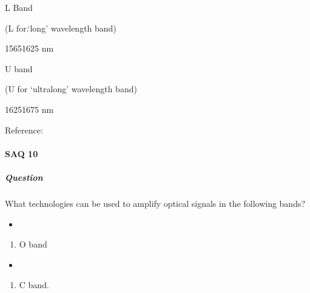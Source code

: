 \documentclass[letterpaper,10pt,english]{sphinxmanual}
\begin{document}
L Band





(L for.‘long’ wavelength band)





1565\textendash{}1625 nm









U band





(U for ‘ultra\sphinxhyphen{}long’ wavelength band)





1625\textendash{}1675 nm







Reference:






\paragraph{SAQ 10}
\label{\detokenize{content/session_00/Part_00_03:SAQ-10}}

\subparagraph{Question}
\label{\detokenize{content/session_00/Part_00_03:id5}}
What technologies can be used to amplify optical signals in the following bands?
\begin{itemize}
\item {} 
\end{itemize}
\begin{enumerate}
%
\item {} 
O band

\end{enumerate}
\begin{itemize}
\item {} 
\end{itemize}
\begin{enumerate}
%
\setcounter{enumi}{1}
\item {} 
C band.

\end{enumerate}
\end{document}
